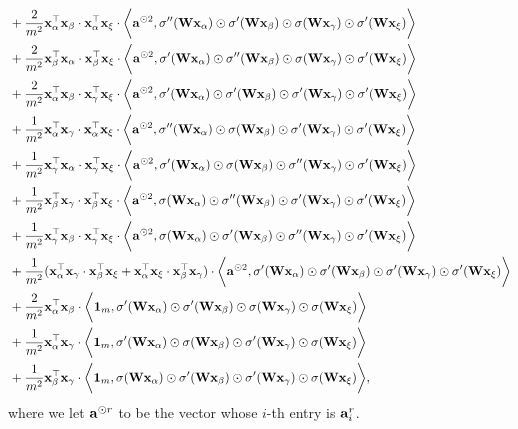 \begin{proposition}
\begin{align}
		& + \frac{2}{m^2}{\mathbf{x}}_\alpha^\top{\mathbf{x}}_\beta \cdot{\mathbf{x}}_\alpha^\top{\mathbf{x}}_\xi \cdot \bigg\langle{\mathbf{a}}^{\odot 2},\sigma''({\mathbf{W}} {\mathbf{x}}_\alpha) \odot \sigma'({\mathbf{W}} {\mathbf{x}}_\beta) \odot \sigma({\mathbf{W}} {\mathbf{x}}_\gamma) \odot \sigma'({\mathbf{W}} {\mathbf{x}}_\xi)   \bigg\rangle \nonumber \\
		& + \frac{2}{m^2}{\mathbf{x}}_\beta^\top{\mathbf{x}}_\alpha\cdot{\mathbf{x}}_\beta^\top{\mathbf{x}}_\xi \cdot \bigg\langle{\mathbf{a}}^{\odot 2},\sigma'({\mathbf{W}} {\mathbf{x}}_\alpha) \odot \sigma''({\mathbf{W}} {\mathbf{x}}_\beta) \odot \sigma({\mathbf{W}} {\mathbf{x}}_\gamma) \odot \sigma'({\mathbf{W}} {\mathbf{x}}_\xi)   \bigg\rangle \nonumber \\
		& + \frac{2}{m^2}{\mathbf{x}}_\alpha^\top{\mathbf{x}}_\beta\cdot{\mathbf{x}}_\gamma^\top{\mathbf{x}}_\xi \cdot \bigg\langle{\mathbf{a}}^{\odot 2},\sigma'({\mathbf{W}} {\mathbf{x}}_\alpha) \odot \sigma'({\mathbf{W}} {\mathbf{x}}_\beta) \odot \sigma'({\mathbf{W}} {\mathbf{x}}_\gamma) \odot \sigma'({\mathbf{W}} {\mathbf{x}}_\xi)   \bigg\rangle \nonumber \\
		& + \frac{1}{m^2}{\mathbf{x}}_\alpha^\top{\mathbf{x}}_\gamma\cdot{\mathbf{x}}_\alpha^\top{\mathbf{x}}_\xi \cdot \bigg\langle{\mathbf{a}}^{\odot 2},\sigma''({\mathbf{W}} {\mathbf{x}}_\alpha) \odot \sigma({\mathbf{W}} {\mathbf{x}}_\beta) \odot \sigma'({\mathbf{W}} {\mathbf{x}}_\gamma) \odot \sigma'({\mathbf{W}} {\mathbf{x}}_\xi)   \bigg\rangle \nonumber \\
		& + \frac{1}{m^2}{\mathbf{x}}_\gamma^\top{\mathbf{x}}_\alpha\cdot{\mathbf{x}}_\gamma^\top{\mathbf{x}}_\xi \cdot \bigg\langle{\mathbf{a}}^{\odot 2},\sigma'({\mathbf{W}} {\mathbf{x}}_\alpha) \odot \sigma({\mathbf{W}} {\mathbf{x}}_\beta) \odot \sigma''({\mathbf{W}} {\mathbf{x}}_\gamma) \odot \sigma'({\mathbf{W}} {\mathbf{x}}_\xi)   \bigg\rangle \nonumber \\
		& + \frac{1}{m^2}{\mathbf{x}}_\beta^\top{\mathbf{x}}_\gamma\cdot{\mathbf{x}}_\beta^\top{\mathbf{x}}_\xi \cdot \bigg\langle{\mathbf{a}}^{\odot 2},\sigma({\mathbf{W}} {\mathbf{x}}_\alpha) \odot \sigma''({\mathbf{W}} {\mathbf{x}}_\beta) \odot \sigma'({\mathbf{W}} {\mathbf{x}}_\gamma) \odot \sigma'({\mathbf{W}} {\mathbf{x}}_\xi)   \bigg\rangle \nonumber \\
		& + \frac{1}{m^2}{\mathbf{x}}_\gamma^\top{\mathbf{x}}_\beta\cdot{\mathbf{x}}_\gamma^\top{\mathbf{x}}_\xi \cdot \bigg\langle{\mathbf{a}}^{\odot 2},\sigma({\mathbf{W}} {\mathbf{x}}_\alpha) \odot \sigma'({\mathbf{W}} {\mathbf{x}}_\beta) \odot \sigma''({\mathbf{W}} {\mathbf{x}}_\gamma) \odot \sigma'({\mathbf{W}} {\mathbf{x}}_\xi)   \bigg\rangle \nonumber \\
		& + \frac{1}{m^2} ({\mathbf{x}}_\alpha^\top{\mathbf{x}}_\gamma\cdot{\mathbf{x}}_\beta^\top{\mathbf{x}}_\xi +{\mathbf{x}}_\alpha^\top{\mathbf{x}}_\xi\cdot{\mathbf{x}}_\beta^\top{\mathbf{x}}_\gamma) \cdot \bigg\langle{\mathbf{a}}^{\odot 2},\sigma'({\mathbf{W}} {\mathbf{x}}_\alpha) \odot \sigma'({\mathbf{W}} {\mathbf{x}}_\beta) \odot \sigma'({\mathbf{W}} {\mathbf{x}}_\gamma) \odot \sigma'({\mathbf{W}} {\mathbf{x}}_\xi)   \bigg\rangle \nonumber \\
		& + \frac{2}{m^2}{\mathbf{x}}_\alpha^\top{\mathbf{x}}_\beta \cdot \bigg\langle \mathbf{1}_m, \sigma'({\mathbf{W}} {\mathbf{x}}_\alpha) \odot \sigma'({\mathbf{W}} {\mathbf{x}}_\beta) \odot \sigma({\mathbf{W}} {\mathbf{x}}_\gamma) \odot \sigma({\mathbf{W}} {\mathbf{x}}_\xi)  \bigg\rangle \nonumber \\
		& + \frac{1}{m^2}{\mathbf{x}}_\alpha^\top{\mathbf{x}}_\gamma \cdot \bigg\langle \mathbf{1}_m, \sigma'({\mathbf{W}} {\mathbf{x}}_\alpha) \odot \sigma({\mathbf{W}} {\mathbf{x}}_\beta) \odot \sigma'({\mathbf{W}} {\mathbf{x}}_\gamma) \odot \sigma({\mathbf{W}} {\mathbf{x}}_\xi)  \bigg\rangle \nonumber \\
		\label{eq: K_4_two_layer}	
		& + \frac{1}{m^2}{\mathbf{x}}_\beta^\top{\mathbf{x}}_\gamma \cdot \bigg\langle \mathbf{1}_m, \sigma({\mathbf{W}} {\mathbf{x}}_\alpha) \odot \sigma'({\mathbf{W}} {\mathbf{x}}_\beta) \odot \sigma'({\mathbf{W}} {\mathbf{x}}_\gamma) \odot \sigma({\mathbf{W}} {\mathbf{x}}_\xi)  \bigg\rangle , 
	\end{align}
	\endgroup
	where we let ${\mathbf{a}}^{\odot r}$ to be the vector whose $i$-th entry is ${\mathbf{a}}_i^r$.
\end{proposition}
